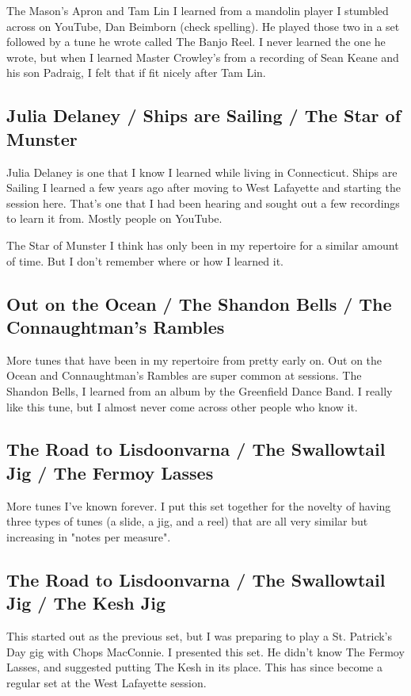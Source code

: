 \documentclass[11pt,letterpaper]{article}
\begin{document}
The Mason's Apron and Tam Lin I learned from a mandolin player I stumbled across on YouTube, Dan Beimborn (check spelling). He played those two in a set followed by a tune he wrote called The Banjo Reel. I never learned the one he wrote, but when I learned Master Crowley's from a recording of Sean Keane and his son Padraig, I felt that if fit nicely after Tam Lin.

\subsection*{Julia Delaney / Ships are Sailing / The Star of Munster}
Julia Delaney is one that I know I learned while living in Connecticut. Ships are Sailing I learned a few years ago after moving to West Lafayette and starting the session here. That's one that I had been hearing and sought out a few recordings to learn it from. Mostly people on YouTube.

The Star of Munster I think has only been in my repertoire for a similar amount of time. But I don't remember where or how I learned it. 

\subsection*{Out on the Ocean / The Shandon Bells / The Connaughtman's Rambles}

More tunes that have been in my repertoire from pretty early on. Out on the Ocean and Connaughtman's Rambles are super common at sessions. The Shandon Bells, I learned from an album by the Greenfield Dance Band. I really like this tune, but I almost never come across other people who know it. 

\subsection*{The Road to Lisdoonvarna / The Swallowtail Jig / The Fermoy Lasses}

More tunes I've known forever. I put this set together for the novelty of having three types of tunes (a slide, a jig, and a reel) that are all very similar but increasing in "notes per measure".

\subsection*{The Road to Lisdoonvarna / The Swallowtail Jig / The Kesh Jig}

This started out as the previous set, but I was preparing to play a St. Patrick's Day gig with Chops MacConnie. I presented this set. He didn't know The Fermoy Lasses, and suggested putting The Kesh in its place. This has since become a regular set at the West Lafayette session.
\end{document}
